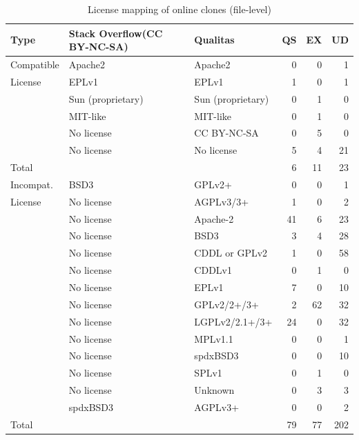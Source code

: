 \documentclass[sigconf,review, anonymous]{acmart}
\begin{document}
\begin{table}[]
	\centering
	\caption{License mapping of  online clones (file-level)}
	\label{tab:license_abc}
	\small
	\begin{tabular}{l|p{1.95cm}l|rrr}
		\hline
		Type & Stack Overflow\newline (CC BY-NC-SA) & Qualitas & QS & EX & UD \\
		\hline
		Compatible & Apache2 & Apache2 &  0 & 0  & 1\\
		License	& EPLv1 & EPLv1 &  1 & 0 & 1\\
		& Sun (proprietary) & Sun (proprietary) & 0 & 1 & 0\\
		& MIT-like & MIT-like & 0 & 1 & 0\\
		& No license & CC BY-NC-SA & 0 & 5 & 0 \\
		& No license & No license & 5 & 4 & 21 \\
		\hline
		\multicolumn{3}{l|}{Total} & 6 & 11 & 23 \\
		\hline
	    Incompat. & BSD3 & GPLv2+ & 0 & 0 & 1 \\
		License	& No license & AGPLv3/3+ & 1 & 0 & 2 \\
		& No license & Apache-2 & 41 & 6 & 23 \\
		& No license & BSD3 & 3 & 4 & 28 \\
		& No license & CDDL or GPLv2 & 1 & 0 & 58 \\
		& No license & CDDLv1 & 0 & 1 & 0 \\
		& No license & EPLv1 & 7 & 0 & 10 \\
		& No license & GPLv2/2+/3+ & 2 & 62 & 32 \\
		& No license & LGPLv2/2.1+/3+ & 24 & 0 & 32 \\
		& No license & MPLv1.1 & 0 & 0 & 1 \\
		& No license & spdxBSD3 & 0 & 0 & 10 \\
		& No license & SPLv1 & 0 & 1 & 0 \\
		& No license & Unknown & 0 & 3 & 3 \\
		& spdxBSD3 & AGPLv3+ & 0 & 0 & 2 \\
		\hline
		\multicolumn{3}{l|}{Total} &  79 & 77 & 202 \\
		\hline
	\end{tabular} %
\end{table}
\end{document}
